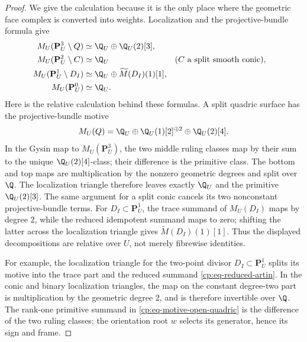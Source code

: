 \begin{proof}
We give the calculation because it is the only place where the geometric
face complex is converted into weights.  Localization and the
projective-bundle formula give
\begin{align}
 M_U(\mathbf P^3_U\setminus Q)
   &\simeq \Q_U\oplus\Q_U(2)[3],
 \label{cp:eq-motive-open-quadric}\\
 M_U(\mathbf P^2_U\setminus C)&\simeq\Q_U
   &&(C\text{ a split smooth conic}),
 \label{cp:eq-motive-open-conic}\\
 M_U(\mathbf P^1_U\setminus D_I)
   &\simeq\Q_U\oplus\widetilde M(D_I)(1)[1],
 \label{cp:eq-motive-punctured-line}\\
 M_U(\mathbf P^0_U)&\simeq\Q_U.
 \label{cp:eq-motive-point}
\end{align}
Here is the relative calculation behind these formulas.  A split quadric
surface has the projective-bundle motive
\[
 M_U(Q)=\Q_U\oplus\Q_U(1)[2]^{\oplus2}\oplus\Q_U(2)[4].
\]
In the Gysin map to \(M_U(\mathbf P^3_U)\), the two middle ruling classes
map by their sum to the unique \(\Q_U(2)[4]\)-class; their difference is
the primitive class.  The bottom and top maps are multiplication by the
nonzero geometric degrees and split over \(\Q\).  The localization
triangle therefore leaves exactly \(\Q_U\) and the primitive
\(\Q_U(2)[3]\).  The same argument for a split conic cancels its two
nonconstant projective-bundle terms.  For
\(D_I\subset\mathbf P^1_U\), the trace summand of \(M_U(D_I)\) maps by
degree \(2\), while the reduced idempotent summand maps to zero; shifting
the latter across the localization triangle gives
\(\widetilde M(D_I)(1)[1]\).  Thus the displayed decompositions are
relative over \(U\), not merely fibrewise identities.

For example, the localization triangle for the two-point divisor
\(D_I\subset\mathbf P^1_U\) splits its motive into the trace part and the
reduced summand \eqref{cp:eq-reduced-artin}.  In the conic and binary
localization triangles, the map on the constant degree-two part is
multiplication by the geometric degree \(2\), and is therefore invertible
over \(\Q\).  The rank-one primitive summand in
\eqref{cp:eq-motive-open-quadric} is the difference of the two ruling
classes; the orientation root \(w\) selects its generator, hence its sign
and frame.


\end{proof}
